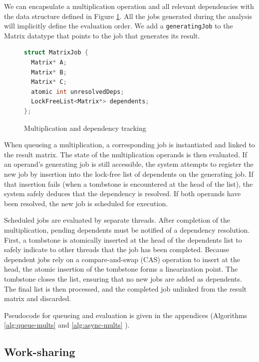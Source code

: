 We can encapsulate a multiplication operation and all relevant dependencies with the data structure defined in 
Figure \ref{fig:mat-job-struct}. All the jobs generated during the analysis will implicitly define the 
evaluation order. We add a \verb|generatingJob| to the Matrix datatype that points to the job that generates its result.

\begin{figure}[htbp]
  \centering
  \begin{minipage}{0.5\textwidth} %
    \begin{lstlisting}[numbers=none, frame=none, language=C++]
struct MatrixJob {
  Matrix* A;
  Matrix* B;
  Matrix* C;
  atomic int unresolvedDeps;
  LockFreeList<Matrix*> dependents;
};
    \end{lstlisting}
  \end{minipage}
  \caption{Multiplication and dependency tracking}
  \label{fig:mat-job-struct}
\end{figure}

When queueing a multiplication, a corresponding job is instantiated and linked to the result matrix. The state of the multiplication 
operands is then evaluated. If an operand's generating job is still accessible, the system attempts to register the new 
job by insertion into the lock-free list of dependents on the generating job. If that insertion fails (when 
a tombstone is encountered at the head of the list), the system safely deduces that the dependency is resolved.
If both operands have been resolved, the new job is scheduled for execution.

Scheduled jobs are evaluated by separate threads. After completion of the multiplication, pending dependents
must be notified of a dependency resolution. First, a tombstone is atomically inserted at the head of the dependents list
to safely indicate to other threads that the job has been completed.
Because dependent jobs rely on a compare-and-swap (CAS) operation to insert at the head, the atomic insertion of the 
tombstone forms a linearization point. The tombstone closes the list, ensuring that no new jobs are added as dependents.
The final list is then processed, and the completed job unlinked from the result matrix and discarded.

Pseudocode for queueing and evaluation is given in the appendices
(Algorithms \ref{alg:queue-mults} and \ref{alg:async-mults} ).

\FloatBarrier
\subsection{Work-sharing} \label{impl:work-sharing}

